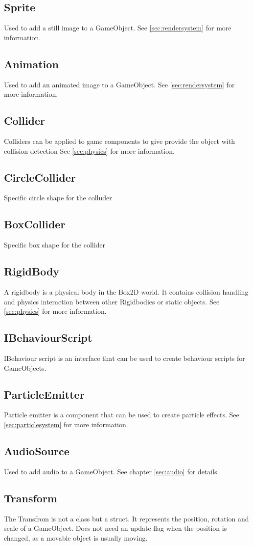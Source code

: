 \subsection{Sprite}
Used to add a still image to a GameObject.
See \autoref{sec:rendersystem} for more information.

\subsection{Animation}
Used to add an animated image to a GameObject.
See \autoref{sec:rendersystem} for more information.

\subsection{Collider}
 Colliders can be applied to game components to give provide the object with collision detection
See \autoref{sec:physics} for more information.
\subsection{CircleCollider}
Specific circle shape for the colluder
\subsection{BoxCollider}
Specific box shape for the collider

\subsection{RigidBody}
A rigidbody is a physical body in the Box2D world. It contains collision handling and physics interaction between other Rigidbodies or static objects.
See \autoref{sec:physics} for more information.

\subsection{IBehaviourScript}
IBehaviour script is an interface that can be used to create behaviour scripts for GameObjects.

\subsection{ParticleEmitter}
Particle emitter is a component that can be used to create particle effects.
See \autoref{sec:particlesystem} for more information.

\subsection{AudioSource}
Used to add audio to a GameObject. See chapter \autoref{sec:audio} for details

\subsection{Transform}
The Transfrom is not a class but a struct. It represents the position, rotation and scale of a GameObject.
Does not need an update flag when the position is changed, as a movable object is usually moving.


